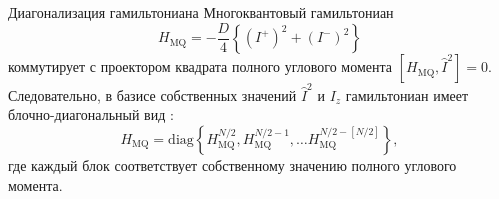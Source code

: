 \begin{frame}{Диагонализация гамильтониана}
Многоквантовый гамильтониан
$$
H_\mathrm{MQ} = - \dfrac{D}{4} \left\{
    \left( I^{+} \right)^2 + \left( I^{-} \right)^2
\right\}
$$
коммутирует с проектором квадрата полного углового момента
$ \left[ H_\mathrm{MQ}, \hat I^2 \right] = 0 $.
Следовательно, в базисе собственных значений  $\hat I^2$ и $I_z$  гамильтониан имеет блочно-диагональный вид :
$$
H_\mathrm{MQ} = \mathrm{diag} \left\{
    H_\mathrm{MQ}^{N/2},
    H_\mathrm{MQ}^{N/2 - 1},
    \dots
    H_\mathrm{MQ}^{N/2 - [N/2]}
\right\},
$$
где каждый блок соответствует собственному значению полного углового момента.
\end{frame}
